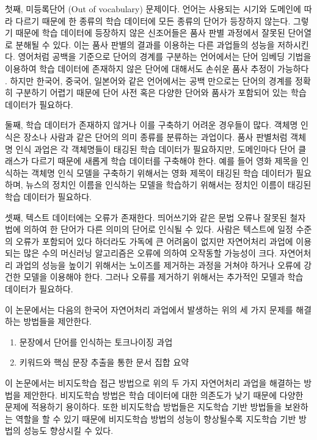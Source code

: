 \documentclass[oneside, ko,phd]{snuthesis_utf8_kor}
\begin{document}
첫째, 미등록단어 (Out of vocabulary) 문제이다.
언어는 사용되는 시기와 도메인에 따라 다르기 때문에 한 종류의 학습 데이터에 모든 종류의 단어가 등장하지 않는다.
그렇기 때문에 학습 데이터에 등장하지 않은 신조어들은 품사 판별 과정에서 잘못된 단어열로 분해될 수 있다.
이는 품사 판별의 결과를 이용하는 다른 과업들의 성능을 저하시킨다.
영어처럼 공백을 기준으로 단어의 경계를 구분하는 언어에서는 단어 임베딩 기법을 이용하여 학습 데이터에 존재하지 않은 단어에 대해서도 손쉬운 품사 추정이 가능하다 \cite{turian2010word, mikolov2013efficient, collobert2011natural}.
하지만 한국어, 중국어, 일본어와 같은 언어에서는 공백 만으로는 단어의 경계를 정확히 구분하기 어렵기 때문에 단어 사전 혹은 다양한 단어와 품사가 포함되어 있는 학습 데이터가 필요하다.

둘째, 학습 데이터가 존재하지 않거나 이를 구축하기 어려운 경우들이 많다.
객체명 인식은 장소나 사람과 같은 단어의 의미 종류를 분류하는 과업이다.
품사 판별처럼 객체명 인식 과업은 각 객체명들이 태깅된 학습 데이터가 필요하지만, 도메인마다 단어 클래스가 다르기 때문에 새롭게 학습 데이터를 구축해야 한다.
예를 들어 영화 제목을 인식하는 객체명 인식 모델을 구축하기 위해서는 영화 제목이 태깅된 학습 데이터가 필요하며, 뉴스의 정치인 이름을 인식하는 모델을 학습하기 위해서는 정치인 이름이 태깅된 학습 데이터가 필요하다.

셋째, 텍스트 데이터에는 오류가 존재한다.
띄어쓰기와 같은 문법 오류나 잘못된 철자법에 의하여 한 단어가 다른 의미의 단어로 인식될 수 있다.
사람은 텍스트에 일정 수준의 오류가 포함되어 있다 하더라도 가독에 큰 어려움이 없지만 자연어처리 과업에 이용되는 많은 수의 머신러닝 알고리즘은 오류에 의하여 오작동할 가능성이 크다.
자연어처리 과업의 성능을 높이기 위해서는 노이즈를 제거하는 과정을 거쳐야 하거나 오류에 강건한 모델을 이용해야 한다.
그러나 오류를 제거하기 위해서는 추가적인 모델과 학습 데이터가 필요하다.

이 논문에서는 다음의 한국어 자연어처리 과업에서 발생하는 위의 세 가지 문제를 해결하는 방법들을 제안한다.

\begin{enumerate}
    \item 문장에서 단어를 인식하는 토크나이징 과업
    \item 키워드와 핵심 문장 추출을 통한 문서 집합 요약
\end{enumerate}

이 논문에서는 비지도학습 접근 방법으로 위의 두 가지 자연어처리 과업을 해결하는 방법을 제안한다.
비지도학습 방법은 학습 데이터에 대한 의존도가 낮기 때문에 다양한 문제에 적용하기 용이하다.
또한 비지도학습 방법들은 지도학습 기반 방법들을 보완하는 역할을 할 수 있기 때문에 비지도학습 방법의 성능이 향상될수록 지도학습 기반 방법의 성능도 향상시킬 수 있다.
\end{document}
